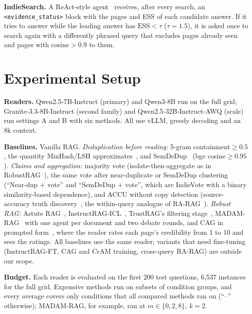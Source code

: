 \documentclass[sigconf,review,anonymous]{acmart}
\newcommand{\ess}{\mathrm{ESS}}
\newcommand{\para}[1]{\smallskip\noindent\textbf{#1}\enspace}
\begin{document}
\para{IndieSearch.} A ReAct-style agent~\cite{jin2025searchr1} receives, after every search, an
\texttt{<evidence\_status>} block with the pages and ESS of each candidate answer. If it tries to answer while the
leading answer has $\ess<\tau$ ($\tau{=}1.5$), it is asked once to search again with a differently phrased query that
excludes pages already seen and pages with cosine${>}0.9$ to them.


\section{Experimental Setup}\label{sec:setup}
\para{Readers.} Qwen2.5-7B-Instruct (primary) and Qwen3-8B run on the full grid; Granite-3.3-8B-Instruct (second family)
and Qwen2.5-32B-Instruct-AWQ (scale) run settings A and B with six methods. All use vLLM, greedy decoding and an 8k
context.

\para{Baselines.} Vanilla RAG. \emph{Deduplication before reading:} 5-gram containment${\geq}0.5$, the quantity
MinHash/LSH approximates~\cite{broder1997resemblance}, and SemDeDup~\cite{abbas2023semdedup} (bge cosine${\geq}0.95$).
\emph{Claims and aggregation:} majority vote (isolate-then-aggregate as in RobustRAG~\cite{xiang2024robustrag}), the
same vote after near-duplicate or SemDeDup clustering (``Near-dup + vote'' and ``SemDeDup + vote'', which are IndieVote
with a binary similarity-based dependence), and ACCU without copy detection (source-accuracy truth
discovery~\cite{dong2009integrating}, the within-query analogue of RA-RAG~\cite{hwang2024rarag}).
\emph{Robust RAG:} Astute RAG~\cite{wang2024astute}, InstructRAG-ICL~\cite{wei2025instructrag}, TrustRAG's filtering
stage~\cite{zhou2025trustrag}, MADAM-RAG~\cite{wang2025ramdocs} with one agent per document and two debate rounds, and
CAG in prompted form~\cite{pan2024cag}, where the reader rates each page's credibility from 1 to 10 and sees the
ratings. All baselines use the same reader; variants that need fine-tuning (InstructRAG-FT, CAG and CrAM training,
cross-query RA-RAG) are outside our scope.

\para{Budget.} Each reader is evaluated on the first 200 test questions, 6{,}537 instances for the full grid.
Expensive methods run on subsets of condition groups, and every average covers only conditions that all compared
methods ran on (``--'' otherwise); MADAM-RAG, for example, ran at $m\in\{0,2,8\}$, $k{=}2$.
\end{document}
